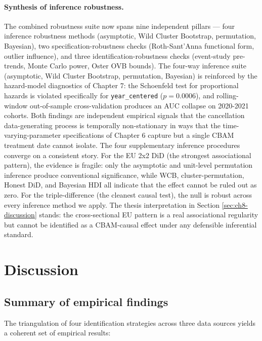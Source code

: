 \documentclass[11pt,a4paper]{article}
\begin{document}
\paragraph{Synthesis of inference robustness.} The combined robustness suite now spans nine independent pillars — four inference robustness methods (asymptotic, Wild Cluster Bootstrap, permutation, Bayesian), two specification-robustness checks (Roth-Sant'Anna functional form, outlier influence), and three identification-robustness checks (event-study pre-trends, Monte Carlo power, Oster OVB bounds). The four-way inference suite (asymptotic, Wild Cluster Bootstrap, permutation, Bayesian) is reinforced by the hazard-model diagnostics of Chapter 7: the Schoenfeld test for proportional hazards is violated specifically for \texttt{year\_centered} ($p = 0.0006$), and rolling-window out-of-sample cross-validation produces an AUC collapse on 2020-2021 cohorts. Both findings are independent empirical signals that the cancellation data-generating process is temporally non-stationary in ways that the time-varying-parameter specifications of Chapter 6 capture but a single CBAM treatment date cannot isolate. The four supplementary inference procedures converge on a consistent story. For the EU 2x2 DiD (the strongest associational pattern), the evidence is fragile: only the asymptotic and unit-level permutation inference produce conventional significance, while WCB, cluster-permutation, Honest DiD, and Bayesian HDI all indicate that the effect cannot be ruled out as zero. For the triple-difference (the cleanest causal test), the null is robust across every inference method we apply. The thesis interpretation in Section \ref{sec:ch8-discussion} stands: the cross-sectional EU pattern is a real associational regularity but cannot be identified as a CBAM-causal effect under any defensible inferential standard.


\section{Discussion}
\label{sec:ch8-discussion-implications}

\subsection{Summary of empirical findings}

The triangulation of four identification strategies across three data sources yields a coherent set of empirical results:
\end{document}

